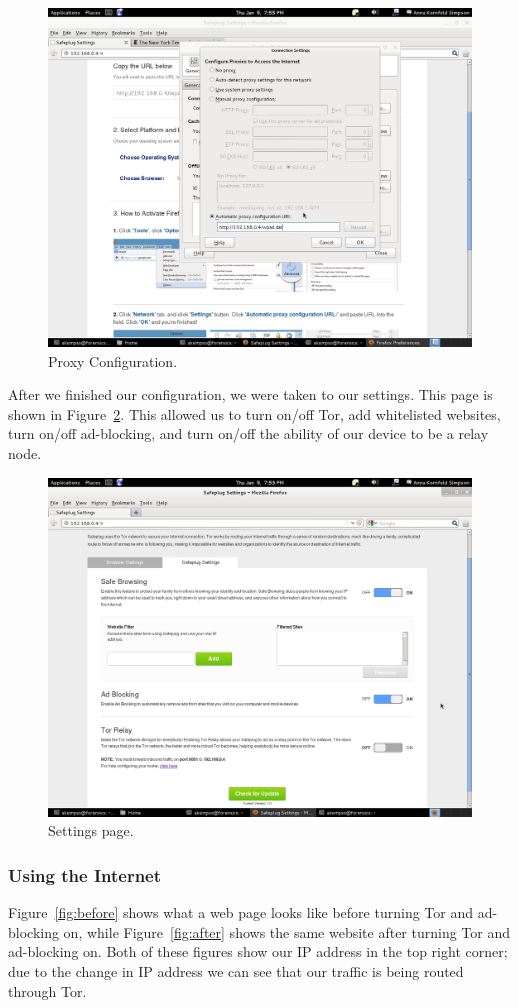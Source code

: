 \begin{figure}[t]
\begin{center}
\includegraphics[width=.75\textwidth]{proxyconfig}
\caption{Proxy Configuration.}
\label{fig:proxyconfig}
\end{center}
\end{figure}

After we finished our configuration, we were taken to our settings.  This page is shown in Figure~\ref{fig:settings}.  This allowed us to turn on/off Tor, add whitelisted websites, turn on/off ad-blocking, and turn on/off the ability of our device to be a relay node.  

\begin{figure}[htb]
\begin{center}
\includegraphics[width=.75\textwidth]{settings}
\caption{Settings page.}
\label{fig:settings}
\end{center}
\end{figure}

\subsubsection{Using the Internet} Figure~\ref{fig:before} shows what a web page looks like before turning Tor and ad-blocking on, while Figure~\ref{fig:after} shows the same website after turning Tor and ad-blocking on.  Both of these figures show our IP address in the top right corner; due to the change in IP address we can see that our traffic is being routed through Tor.  

